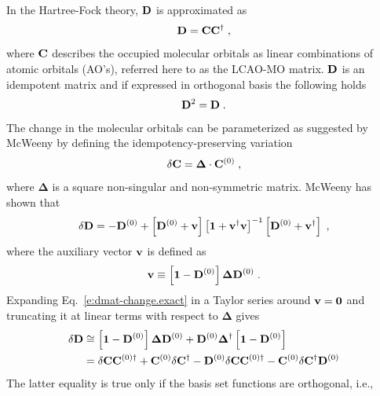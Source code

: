 \documentclass[aip,amsmath,amssymb,reprint]{revtex4-1}
\newcommand{\BM}[1]{\bm{#1}}
\begin{document}
In the Hartree\hyp{}Fock theory, ${\bf D}$ is approximated as
%
\begin{equation}
 {\bf D} = {\bf C}{\bf C}^\dagger \;,
\end{equation}
%
where ${\bf C}$ describes the occupied molecular orbitals as linear combinations
of atomic orbitals (AO's), referred here to as the LCAO-MO matrix.
${\bf D}$ is an idempotent matrix and if expressed in orthogonal basis the following holds
%
\begin{equation}
 {\bf D}^2 = {\bf D} \;.
\end{equation}
%
The change in the molecular orbitals can be parameterized as suggested by McWeeny\cite{McWeeny.RevModPhys.1960}
by defining the idempotency\hyp{}preserving variation
%
\begin{equation}
 \delta {\bf C} = {\BM\Delta} \cdot {\bf C}^{(0)} \;,
\end{equation}
%
where $\BM\Delta$ is a square non\hyp{}singular and non\hyp{}symmetric matrix.
McWeeny has shown that
%
\begin{equation} \label{e:dmat-change.exact}
 \delta {\bf D} = -{\bf D}^{(0)} + \left[ {\bf D}^{(0)} + {\bf v} \right]
                                   \left[ {\bf 1} + {\bf v}^\dagger{\bf v} \right]^{-1}
                                   \left[ {\bf D}^{(0)} + {\bf v}^\dagger \right] \;,
\end{equation}
%
where the auxiliary vector ${\bf v}$ is defined as
%
\begin{equation}
 {\bf v} \equiv \left[ {\bf 1} - {\bf D}^{(0)} \right] {\BM\Delta} {\bf D}^{(0)}  \;.
\end{equation}
%
Expanding Eq.~\eqref{e:dmat-change.exact} in a Taylor series around ${\bf v}={\bf 0}$ and
truncating it at linear terms with respect to ${\BM\Delta}$ gives
%
\begin{subequations} 
 \begin{align}
 \delta {\bf D} &\cong \left[ {\bf 1} - {\bf D}^{(0)} \right] {\BM\Delta} {\bf D}^{(0)} + 
                        {\bf D}^{(0)} {\BM\Delta}^\dagger \left[ {\bf 1} - {\bf D}^{(0)} \right]  
 \label{e:dD-1} \\  &= 
  \delta {\bf C}  {\bf C}^{(0)\dagger} + {\bf C}^{(0)}\delta {\bf C}^\dagger
           - {\bf D}^{(0)} \delta {\bf C}  {\bf C}^{{(0)}\dagger} - {\bf C}^{(0)}\delta {\bf C}^\dagger {\bf D}^{(0)} 
 \label{e:dD-2}
 \end{align}
\end{subequations}
%
The latter equality is true only if the basis set functions are orthogonal, i.e., 
\end{document}
